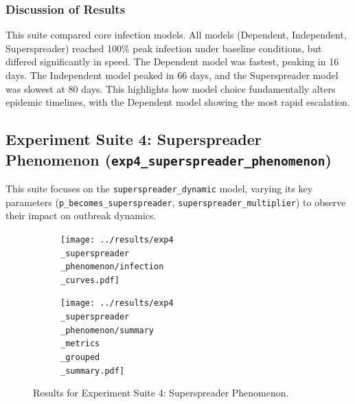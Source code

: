 \documentclass[12pt]{article}
\begin{document}
\subsubsection*{Discussion of Results}
This suite compared core infection models. All models (Dependent, Independent, Superspreader) reached 100\% peak infection under baseline conditions, but differed significantly in speed. The Dependent model was fastest, peaking in 16 days. The Independent model peaked in 66 days, and the Superspreader model was slowest at 80 days. This highlights how model choice fundamentally alters epidemic timelines, with the Dependent model showing the most rapid escalation.

\subsection[Exp Suite 4: Superspreader Phenomenon]{Experiment Suite 4: Superspreader Phenomenon (\texttt{exp4\_su\-per\-spread\-er\_phe\-no\-me\-non})}
This suite focuses on the \texttt{superspreader\_dynamic} model, varying its key parameters (\texttt{p\_becomes\_superspreader}, \texttt{superspreader\_multiplier}) to observe their impact on outbreak dynamics. \begin{figure}[htbp!] \centering \begin{subfigure}{.48\textwidth} \centering \texttt{[image: ../results/exp4\\\_superspreader\\\_phenomenon/infection\\\_curves.pdf]} 
 \label{fig:exp4_curves} \end{subfigure} \hfill \begin{subfigure}{.48\textwidth} \centering \texttt{[image: ../results/exp4\\\_superspreader\\\_phenomenon/summary\\\_metrics\\\_grouped\\\_summary.pdf]} 
 \label{fig:exp4_summary} \end{subfigure} \caption[Exp Suite 4 Results]{Results for Experiment Suite 4: Superspreader Phenomenon.} \label{fig:exp4_results} \end{figure}
\end{document}
